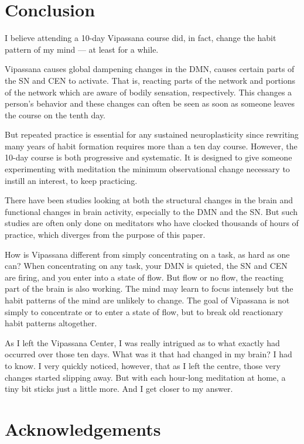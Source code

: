 \documentclass[a4paper, amsfonts, amssymb, amsmath, reprint, showkeys, nofootinbib, twoside]{revtex4-1}
\begin{document}
\section{Conclusion}

I believe attending a 10-day Vipassana course did, in fact, change the habit pattern
of my mind --- at least for a while.

Vipassana causes global dampening changes in the DMN, causes certain parts of
the SN and CEN to activate. That is, reacting parts of the network and
portions of the network which are aware of bodily sensation, respectively.
This changes a person's behavior and these changes can often be seen as soon as
someone leaves the course on the tenth day.

But repeated practice is essential for any sustained neuroplasticity since rewriting
many years of habit formation requires more than a ten day course. However, the
10-day course is both progressive and systematic. It is designed to give someone
experimenting with meditation the minimum observational change necessary to instill
an interest, to keep practicing.

There have been studies looking at both the structural changes in the brain and
functional changes in brain activity, especially to the DMN and the SN. But such
studies are often only done on meditators who have clocked thousands of hours of
practice, which diverges from the purpose of this paper. \cite{tibetanmonks,
  experiencemed, experiencemeda}

How is Vipassana different from simply concentrating on a task, as hard as one can?
When concentrating on any task, your DMN is quieted, the SN and CEN are firing, and you
enter into a state of flow. But flow or no flow, the reacting part of the brain is
also working. The mind may learn to focus intensely but the habit patterns of the
mind are unlikely to change. The goal of Vipassana is not simply to concentrate or to
enter a state of flow, but to break old reactionary habit patterns altogether.

As I left the Vipassana Center, I was really intrigued as to what exactly had
occurred over those ten days. What was it that had changed in my brain? I had to
know. I very quickly noticed, however, that as I left the centre, those very changes
started slipping away. But with each hour-long meditation at home, a tiny bit sticks
just a little more. And I get closer to my answer.

\section{Acknowledgements}
\end{document}

